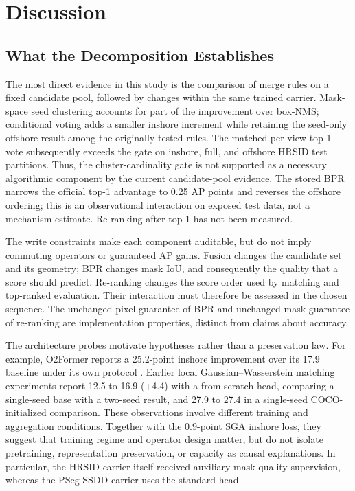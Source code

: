 \section{Discussion}\label{sec:discussion}

\subsection{What the Decomposition Establishes}\label{sec:disc-preservation}
The most direct evidence in this study is the comparison of merge rules on a fixed candidate pool, followed by changes within the same trained carrier. Mask-space seed clustering accounts for part of the improvement over box-NMS; conditional voting adds a smaller inshore increment while retaining the seed-only offshore result among the originally tested rules. The matched per-view top-1 vote subsequently exceeds the gate on inshore, full, and offshore HRSID test partitions. Thus, the cluster-cardinality gate is not supported as a necessary algorithmic component by the current candidate-pool evidence. The stored BPR narrows the official top-1 advantage to 0.25 AP points and reverses the offshore ordering; this is an observational interaction on exposed test data, not a mechanism estimate. Re-ranking after top-1 has not been measured.

The write constraints make each component auditable, but do not imply commuting operators or guaranteed AP gains. Fusion changes the candidate set and its geometry; BPR changes mask IoU, and consequently the quality that a score should predict. Re-ranking changes the score order used by matching and top-ranked evaluation. Their interaction must therefore be assessed in the chosen sequence. The unchanged-pixel guarantee of BPR and unchanged-mask guarantee of re-ranking are implementation properties, distinct from claims about accuracy.

The architecture probes motivate hypotheses rather than a preservation law. For example, O2Former reports a 25.2-point inshore improvement over its 17.9 baseline under its own protocol \cite{o2former2025}. Earlier local Gaussian--Wasserstein matching experiments report 12.5 to 16.9 (+4.4) with a from-scratch head, comparing a single-seed base with a two-seed result, and 27.9 to 27.4 in a single-seed COCO-initialized comparison. These observations involve different training and aggregation conditions. Together with the 0.9-point SGA inshore loss, they suggest that training regime and operator design matter, but do not isolate pretraining, representation preservation, or capacity as causal explanations. In particular, the HRSID carrier itself received auxiliary mask-quality supervision, whereas the PSeg-SSDD carrier uses the standard head.

